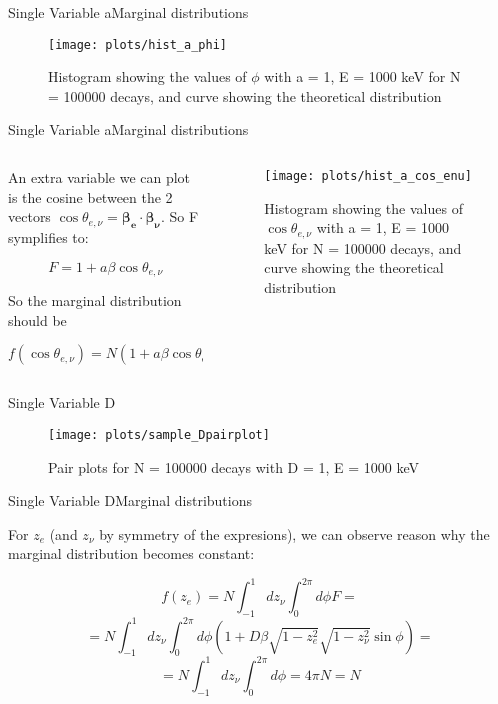 \documentclass{beamer}
\begin{document}
\begin{frame}{Single Variable a}{Marginal distributions}
	
	\begin{figure}
		\centering
		\texttt{[image: plots/hist\_a\_phi]}
		\caption{Histogram showing the values of $\phi$ with a = 1, E = 1000 keV for N = 100000 decays, and curve showing the theoretical distribution}
	\end{figure}
	
	
\end{frame}
\begin{frame}{Single Variable a}{Marginal distributions}
	\begin{columns}
		\begin{column}{0.5\textwidth}
			An extra variable we can plot is the cosine between the 2 vectors $\cos \theta_{e,\nu} = \boldsymbol{\beta_e}\cdot\boldsymbol{\beta_\nu}$. So F symplifies to:
			
			$$F = 1 + a\beta\cos \theta_{e,\nu}$$
			
			So the marginal distribution should be 
			
			$$f(\cos \theta_{e,\nu}) = N(1+a\beta \cos \theta_{e,\nu})$$

		\end{column}
		\begin{column}{0.5\textwidth}
			\begin{figure}
				\centering
				\texttt{[image: plots/hist\_a\_cos\_enu]}
				\caption{Histogram showing the values of $\cos \theta_{e,\nu}$ with a = 1, E = 1000 keV for N = 100000 decays, and curve showing the theoretical distribution}
			\end{figure}
		\end{column}
	\end{columns}
\end{frame}
\begin{frame}{Single Variable D}
	\begin{figure}
		\centering
		\texttt{[image: plots/sample\_Dpairplot]}
		\caption{Pair plots for N = 100000 decays with D = 1, E = 1000 keV}
	\end{figure}
\end{frame}
\begin{frame}{Single Variable D}{Marginal distributions}
	
	
	For $z_e$ (and $z_\nu$ by symmetry of the expresions), we can observe reason why the marginal distribution becomes constant: 
	
	$$f(z_e) = N\int_{-1}^{1}dz_\nu\int_{0}^{2\pi}d\phi F =$$$$= N\int_{-1}^{1}dz_\nu\int_{0}^{2\pi}d\phi (1 + D\beta\sqrt{1-z^2_e}\sqrt{1-z^2_\nu}\sin \phi) = $$$$ = N\int_{-1}^{1}dz_\nu\int_{0}^{2\pi}d\phi = 4\pi N = N $$
	
	
\end{frame}
\end{document}

